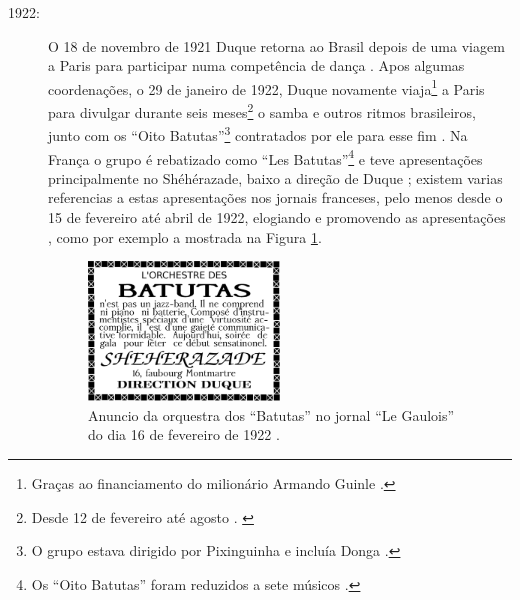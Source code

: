 \begin{description}
\item[1922:] O 18 de novembro de 1921 Duque retorna ao Brasil depois de uma viagem a Paris 
para participar numa competência de dança \cite[pp. 465]{marcondes1977enciclopedia} \cite[pp. 3]{duque1921:a}.
Apos algumas coordenações,
o 29 de janeiro de 1922, Duque novamente viaja\footnote{Graças 
ao financiamento do milionário Armando Guinle \cite[pp. 465]{marcondes1977enciclopedia}.} 
 a Paris para divulgar durante seis meses\footnote{Desde 
12 de fevereiro até agosto \cite{BASTOS2005}. \cite[pp. 5]{batutas1922:c}} 
o samba e outros ritmos brasileiros, 
junto com os ``Oito Batutas''\footnote{O 
grupo estava dirigido por Pixinguinha e incluía Donga \cite{BASTOS2005}.} 
contratados por ele para esse fim
\cite[pp. 13]{duque1922:a} \cite[pp. 465]{marcondes1977enciclopedia}.
Na França o grupo é rebatizado como ``Les Batutas''\footnote{Os 
``Oito Batutas'' foram reduzidos a sete músicos \cite{BASTOS2005}.} 
e teve apresentações principalmente no Shéhérazade, 
baixo a direção de Duque \cite[pp. 465]{marcondes1977enciclopedia} \cite{BASTOS2005} \cite[pp. 1]{Dansons:1};
existem varias referencias a estas apresentações nos jornais franceses, 
pelo menos desde o 15 de fevereiro até abril de 1922, elogiando e promovendo as apresentações 
\cite[pp. 5]{batutas1922:a} \cite[pp. 4]{batutas1922:b} \cite{batutas1922:d},
como por exemplo a mostrada na Figura \ref{fig:LesBatutas}.


  \begin{figure}[h!]
    \centering
    \includegraphics[width=0.5\textwidth]{chapters/cap-historia-sambagafieira/batutas.eps}
    \caption{Anuncio da orquestra dos ``Batutas'' no jornal ``Le Gaulois'' do dia 16 de fevereiro de 1922 \cite[pp. 4]{batutas1922:b}.}
    \label{fig:LesBatutas}
  \end{figure}


\end{description}
